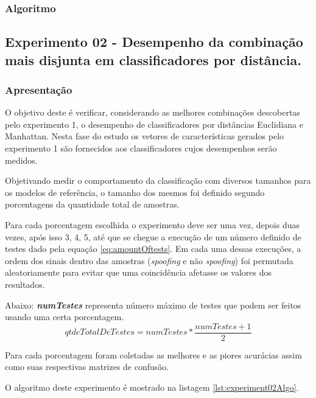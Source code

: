 \begin{myenv}{1.5}
				\subsubsection{Algoritmo}
				

			\subsection{Experimento 02 - Desempenho da combinação mais disjunta em classificadores por distância.}
				\subsubsection{Apresentação}
					\par O objetivo deste é verificar, considerando as melhores combinações descobertas pelo experimento 1, o desempenho de classificadores por distâncias Euclidiana e Manhattan. Nesta fase do estudo os vetores de características gerados pelo experimento 1 são fornecidos aos classificadores cujos desempenhos serão medidos.
					
					\par Objetivando medir o comportamento da classificação com diversos tamanhos para os modelos de referência, o tamanho dos mesmos foi definido segundo porcentagens da quantidade total de amostras.
					
					\par Para cada porcentagem escolhida o experimento deve ser uma vez, depois duas vezes, após isso 3, 4, 5, até que se chegue a execução de um número definido de testes dado pela equação \ref{eq:amountOftests}. Em cada uma dessas execuções, a ordem dos sinais dentro das amostras (\textit{spoofing} e não \textit{spoofing}) foi permutada aleatoriamente para evitar que uma coincidência afetasse os valores dos resultados.
					
					\par Abaixo: \textit{\textbf{numTestes}} representa número máximo de testes que podem ser feitos usando uma certa porcentagem.
					\begin{equation}
						\label{eq:amountOftests}
						qtdeTotalDeTestes= numTestes * \dfrac{numTestes + 1}{2}
					\end{equation}
					
					\par Para cada porcentagem foram coletadas as melhores e as piores acurácias assim como suas respectivas matrizes de confusão.
					
					\par O algoritmo deste experimento é mostrado na listagem \ref{lst:experiment02Algo}.
									

\end{myenv}
